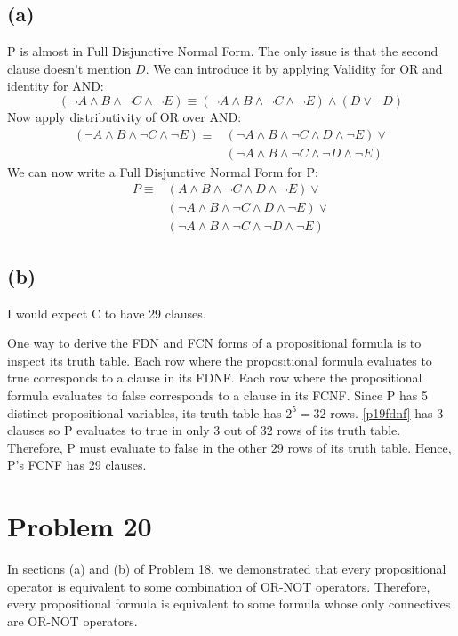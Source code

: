 \documentclass{article}
\begin{document}
\subsection{(a)}
P is almost in Full Disjunctive Normal Form. The only issue is that the second clause doesn't mention $D$. We can introduce it by applying Validity for OR and identity for AND:
\[
	(\neg A \land B \land \neg C \land \neg E) \equiv (\neg A \land B \land \neg C \land \neg E) \land (D \lor \neg D)
\]
Now apply distributivity of OR over AND:
\begin{align*}
	(\neg A \land B \land \neg C \land \neg E) \equiv & (\neg A \land B \land \neg C \land D \land \neg E) \lor \\
	                                                  & (\neg A \land B \land \neg C \land \neg D \land \neg E)
\end{align*}
We can now write a Full Disjunctive Normal Form for P:
\begin{align*}
	P \equiv & (A \land B \land \neg C \land D \land \neg E) \lor                                        \\
	         & (\neg A \land B \land \neg C \land D \land \neg E) \lor                                   \\
	         & (\neg A \land B \land \neg C \land \neg D \land \neg E) \tag{\theequation}\label{p19fdnf}
\end{align*}
\subsection{(b)}
I would expect C to have 29 clauses.

One way to derive the FDN and FCN forms of a propositional formula is to inspect its truth table. Each row where the propositional formula evaluates to true corresponds to a clause in its FDNF. Each row where the propositional formula evaluates to false corresponds to a clause in its FCNF. Since P has 5 distinct propositional variables, its truth table has $2^5 = 32$ rows. \eqref{p19fdnf} has 3 clauses so P evaluates to true in only $3$ out of $32$ rows of its truth table. Therefore, P must evaluate to false in the other $29$ rows of its truth table. Hence, P's FCNF has 29 clauses.

\pagebreak

\section{Problem 20}
In sections (a) and (b) of Problem 18, we demonstrated that every propositional operator is equivalent to some combination of OR-NOT operators. Therefore, every propositional formula is equivalent to some formula whose only connectives are OR-NOT operators.
\end{document}

